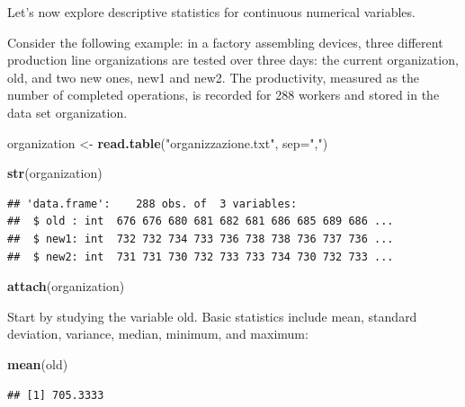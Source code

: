 \documentclass[
]{article}
\newenvironment{Shaded}{\begin{snugshade}}{\end{snugshade}}
\newcommand{\AttributeTok}[1]{\textcolor[rgb]{0.13,0.29,0.53}{#1}}
\newcommand{\FunctionTok}[1]{\textcolor[rgb]{0.13,0.29,0.53}{\textbf{#1}}}
\newcommand{\NormalTok}[1]{#1}
\newcommand{\OtherTok}[1]{\textcolor[rgb]{0.56,0.35,0.01}{#1}}
\newcommand{\StringTok}[1]{\textcolor[rgb]{0.31,0.60,0.02}{#1}}
\begin{document}
Let's now explore descriptive statistics for continuous numerical
variables.

Consider the following example: in a factory assembling devices, three
different production line organizations are tested over three days: the
current organization, old, and two new ones, new1 and new2. The
productivity, measured as the number of completed operations, is
recorded for 288 workers and stored in the data set organization.

\begin{Shaded}
\begin{Highlighting}[]
\NormalTok{organization }\OtherTok{\textless{}{-}} \FunctionTok{read.table}\NormalTok{(}\StringTok{"organizzazione.txt"}\NormalTok{, }\AttributeTok{sep=}\StringTok{","}\NormalTok{)}
\end{Highlighting}
\end{Shaded}

\begin{Shaded}
\begin{Highlighting}[]
\FunctionTok{str}\NormalTok{(organization)}
\end{Highlighting}
\end{Shaded}

\begin{verbatim}
## 'data.frame':    288 obs. of  3 variables:
##  $ old : int  676 676 680 681 682 681 686 685 689 686 ...
##  $ new1: int  732 732 734 733 736 738 738 736 737 736 ...
##  $ new2: int  731 731 730 732 733 733 734 730 732 733 ...
\end{verbatim}

\begin{Shaded}
\begin{Highlighting}[]
\FunctionTok{attach}\NormalTok{(organization)}
\end{Highlighting}
\end{Shaded}

Start by studying the variable old. Basic statistics include mean,
standard deviation, variance, median, minimum, and maximum:

\begin{Shaded}
\begin{Highlighting}[]
\FunctionTok{mean}\NormalTok{(old)}
\end{Highlighting}
\end{Shaded}

\begin{verbatim}
## [1] 705.3333
\end{verbatim}
\end{document}
